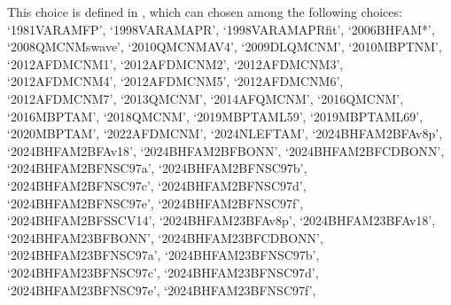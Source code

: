 \documentclass[letterpaper,10pt,english]{sphinxmanual}
\begin{document}
\begin{fulllineitems}
\sphinxAtStartPar
This choice is defined in , which can chosen among     the following choices:     ‘1981\sphinxhyphen{}VAR\sphinxhyphen{}AM\sphinxhyphen{}FP’, ‘1998\sphinxhyphen{}VAR\sphinxhyphen{}AM\sphinxhyphen{}APR’, ‘1998\sphinxhyphen{}VAR\sphinxhyphen{}AM\sphinxhyphen{}APR\sphinxhyphen{}fit’, ‘2006\sphinxhyphen{}BHF\sphinxhyphen{}AM*’,     ‘2008\sphinxhyphen{}QMC\sphinxhyphen{}NM\sphinxhyphen{}swave’, ‘2010\sphinxhyphen{}QMC\sphinxhyphen{}NM\sphinxhyphen{}AV4’, ‘2009\sphinxhyphen{}DLQMC\sphinxhyphen{}NM’, ‘2010\sphinxhyphen{}MBPT\sphinxhyphen{}NM’,     ‘2012\sphinxhyphen{}AFDMC\sphinxhyphen{}NM\sphinxhyphen{}1’, ‘2012\sphinxhyphen{}AFDMC\sphinxhyphen{}NM\sphinxhyphen{}2’, ‘2012\sphinxhyphen{}AFDMC\sphinxhyphen{}NM\sphinxhyphen{}3’, ‘2012\sphinxhyphen{}AFDMC\sphinxhyphen{}NM\sphinxhyphen{}4’,     ‘2012\sphinxhyphen{}AFDMC\sphinxhyphen{}NM\sphinxhyphen{}5’, ‘2012\sphinxhyphen{}AFDMC\sphinxhyphen{}NM\sphinxhyphen{}6’, ‘2012\sphinxhyphen{}AFDMC\sphinxhyphen{}NM\sphinxhyphen{}7’,     ‘2013\sphinxhyphen{}QMC\sphinxhyphen{}NM’, ‘2014\sphinxhyphen{}AFQMC\sphinxhyphen{}NM’, ‘2016\sphinxhyphen{}QMC\sphinxhyphen{}NM’, ‘2016\sphinxhyphen{}MBPT\sphinxhyphen{}AM’,     ‘2018\sphinxhyphen{}QMC\sphinxhyphen{}NM’, ‘2019\sphinxhyphen{}MBPT\sphinxhyphen{}AM\sphinxhyphen{}L59’, ‘2019\sphinxhyphen{}MBPT\sphinxhyphen{}AM\sphinxhyphen{}L69’,     ‘2020\sphinxhyphen{}MBPT\sphinxhyphen{}AM’, ‘2022\sphinxhyphen{}AFDMC\sphinxhyphen{}NM’, ‘2024\sphinxhyphen{}NLEFT\sphinxhyphen{}AM’,     ‘2024\sphinxhyphen{}BHF\sphinxhyphen{}AM\sphinxhyphen{}2BF\sphinxhyphen{}Av8p’, ‘2024\sphinxhyphen{}BHF\sphinxhyphen{}AM\sphinxhyphen{}2BF\sphinxhyphen{}Av18’, ‘2024\sphinxhyphen{}BHF\sphinxhyphen{}AM\sphinxhyphen{}2BF\sphinxhyphen{}BONN’, ‘2024\sphinxhyphen{}BHF\sphinxhyphen{}AM\sphinxhyphen{}2BF\sphinxhyphen{}CDBONN’,     ‘2024\sphinxhyphen{}BHF\sphinxhyphen{}AM\sphinxhyphen{}2BF\sphinxhyphen{}NSC97a’, ‘2024\sphinxhyphen{}BHF\sphinxhyphen{}AM\sphinxhyphen{}2BF\sphinxhyphen{}NSC97b’, ‘2024\sphinxhyphen{}BHF\sphinxhyphen{}AM\sphinxhyphen{}2BF\sphinxhyphen{}NSC97c’, ‘2024\sphinxhyphen{}BHF\sphinxhyphen{}AM\sphinxhyphen{}2BF\sphinxhyphen{}NSC97d’,     ‘2024\sphinxhyphen{}BHF\sphinxhyphen{}AM\sphinxhyphen{}2BF\sphinxhyphen{}NSC97e’, ‘2024\sphinxhyphen{}BHF\sphinxhyphen{}AM\sphinxhyphen{}2BF\sphinxhyphen{}NSC97f’, ‘2024\sphinxhyphen{}BHF\sphinxhyphen{}AM\sphinxhyphen{}2BF\sphinxhyphen{}SSCV14’,     ‘2024\sphinxhyphen{}BHF\sphinxhyphen{}AM\sphinxhyphen{}23BF\sphinxhyphen{}Av8p’, ‘2024\sphinxhyphen{}BHF\sphinxhyphen{}AM\sphinxhyphen{}23BF\sphinxhyphen{}Av18’, ‘2024\sphinxhyphen{}BHF\sphinxhyphen{}AM\sphinxhyphen{}23BF\sphinxhyphen{}BONN’, ‘2024\sphinxhyphen{}BHF\sphinxhyphen{}AM\sphinxhyphen{}23BF\sphinxhyphen{}CDBONN’,     ‘2024\sphinxhyphen{}BHF\sphinxhyphen{}AM\sphinxhyphen{}23BF\sphinxhyphen{}NSC97a’, ‘2024\sphinxhyphen{}BHF\sphinxhyphen{}AM\sphinxhyphen{}23BF\sphinxhyphen{}NSC97b’, ‘2024\sphinxhyphen{}BHF\sphinxhyphen{}AM\sphinxhyphen{}23BF\sphinxhyphen{}NSC97c’, ‘2024\sphinxhyphen{}BHF\sphinxhyphen{}AM\sphinxhyphen{}23BF\sphinxhyphen{}NSC97d’,     ‘2024\sphinxhyphen{}BHF\sphinxhyphen{}AM\sphinxhyphen{}23BF\sphinxhyphen{}NSC97e’, ‘2024\sphinxhyphen{}BHF\sphinxhyphen{}AM\sphinxhyphen{}23BF\sphinxhyphen{}NSC97f’, 
\end{fulllineitems}
\end{document}
